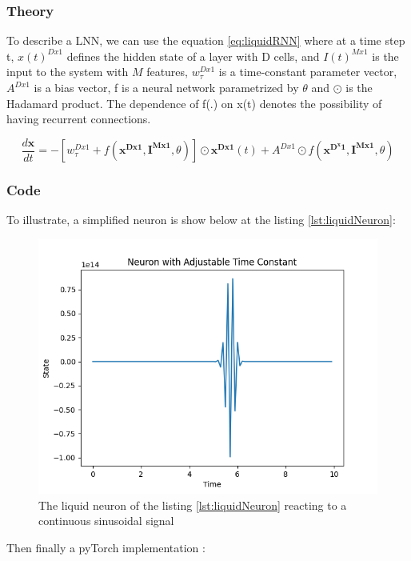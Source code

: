 \begin{frame}
	\frametitle{Theory}
	\par To describe a LNN, we can use the equation \ref{eq:liquidRNN} \cite{Hasani2022} where at a time step t, $x(t)^{Dx1}$ defines the hidden state of a layer with D cells, and $I(t)^{Mx1}$ is the input to the system with $M$ features, $w_{\tau}^{Dx1}$ is a time-constant parameter vector,$A^{Dx1}$ is a bias vector, f is a neural network parametrized by $\theta$ and $\odot$ is the Hadamard product. The dependence of f(.) on x(t) denotes the possibility of having recurrent connections.
	
	\begin{equation}
		\label{eq:liquidRNN}
		\frac{d\mathbf{x}}{dt} = -[w_{\tau}^{Dx1} + f(\mathbf{x^{Dx1}}, \mathbf{I^{Mx1}}, \theta)] \odot \mathbf{x^{Dx1}}(t) + A^{Dx1} \odot f(\mathbf{x^{D^x1}}, \mathbf{I^{Mx1}}, \theta)
	\end{equation}


\end{frame}

\begin{frame}[allowframebreaks]
	\frametitle{Code}
	\par To illustrate, a simplified neuron is show below at the listing \ref{lst:liquidNeuron}:
	
	\begin{figure}
		\centering
		\includegraphics[width=0.35\linewidth]{images/liquidNeuron}
		\caption[A liquid neuron]{The liquid neuron of the listing \ref{lst:liquidNeuron} reacting to a continuous sinusoidal signal}
		\label{fig:liquidneuron}
	\end{figure}
	
	\par Then finally a pyTorch implementation \cite{liquid_nn_article}:
	
\end{frame}
